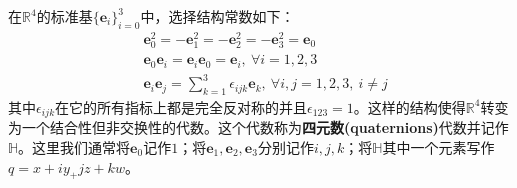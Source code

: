 \documentclass[mathserif,hyperref,UTF8,openany,b5paper]{ctexbook}
\begin{document}
在$\mathbb{R}^4$的标准基$\{\mathbf{e}_i\}^3_{i=0}$中，选择结构常数如下：
\begin{align}
    &\mathbf{e}_0^2=-\mathbf{e}_1^2=-\mathbf{e}_2^2=-\mathbf{e}_3^2=\mathbf{e}_0\\
    &\mathbf{e}_0\mathbf{e}_i=\mathbf{e}_i\mathbf{e}_0=\mathbf{e}_i, \ \forall i= 1,2,3\\
    &\mathbf{e}_i\mathbf{e}_j=\sum^3_{k=1}\epsilon_{ijk}\mathbf{e}_k,\ \forall i,j = 1,2,3, \ i\neq j
\end{align}
其中$\epsilon_{ijk}$在它的所有指标上都是完全反对称的并且$\epsilon_{123}=1$。这样的结构使得$\mathbb{R}^4$转变为一个结合性但非交换性的代数。这个代数称为\textbf{四元数(quaternions)}代数并记作$\mathbb{H}$。这里我们通常将$\mathbf{e}_0$记作$1$；将$\mathbf{e}_1,\mathbf{e}_2,\mathbf{e}_3$分别记作$i,j,k$；将$\mathbb{H}$其中一个元素写作$q=x+iy_+jz+kw$。
\end{document}
